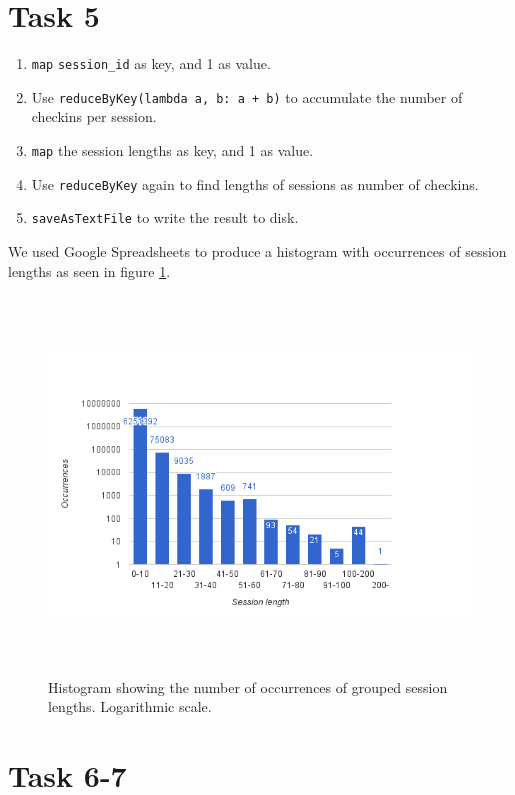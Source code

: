\section{Task 5}


\begin{enumerate}
    \item \verb|map| \verb|session_id| as key, and 1 as value.
    \item Use \verb|reduceByKey(lambda a, b: a + b)| to accumulate the number of checkins per session.
    \item \verb|map| the session lengths as key, and 1 as value.
    \item Use \verb|reduceByKey| again to find lengths of sessions as number of checkins.
    \item \verb|saveAsTextFile| to write the result to disk. 
\end{enumerate}
    
We used Google Spreadsheets to produce a histogram with occurrences of session lengths as seen in figure \ref{fig:histogram}.
\begin{figure}
\centering
\includegraphics[height=10cm]{figs/image.png}
\caption{Histogram showing the number of occurrences of grouped session lengths. Logarithmic scale.}
\label{fig:histogram}
\end{figure}



\section{Task 6-7}

